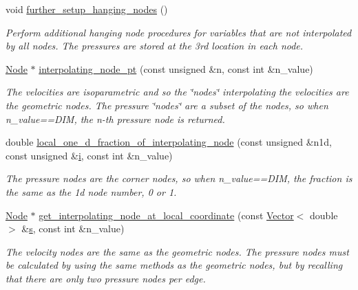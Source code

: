\begin{DoxyCompactItemize}
void \hyperlink{classoomph_1_1RefineableGeneralisedNewtonianAxisymmetricQTaylorHoodElement_aef635d4f6f88c070bf0eeda652639795}{further\+\_\+setup\+\_\+hanging\+\_\+nodes} ()
\begin{DoxyCompactList}\small\item\em Perform additional hanging node procedures for variables that are not interpolated by all nodes. The pressures are stored at the 3rd location in each node. \end{DoxyCompactList}\item 
\hyperlink{classoomph_1_1Node}{Node} $\ast$ \hyperlink{classoomph_1_1RefineableGeneralisedNewtonianAxisymmetricQTaylorHoodElement_a23cdbc15e3da1994d71e8b2bab5a53eb}{interpolating\+\_\+node\+\_\+pt} (const unsigned \&n, const int \&n\+\_\+value)
\begin{DoxyCompactList}\small\item\em The velocities are isoparametric and so the \char`\"{}nodes\char`\"{} interpolating the velocities are the geometric nodes. The pressure \char`\"{}nodes\char`\"{} are a subset of the nodes, so when n\+\_\+value==D\+IM, the n-\/th pressure node is returned. \end{DoxyCompactList}\item 
double \hyperlink{classoomph_1_1RefineableGeneralisedNewtonianAxisymmetricQTaylorHoodElement_ae4e303afba918ad72418cd384d4da3c9}{local\+\_\+one\+\_\+d\+\_\+fraction\+\_\+of\+\_\+interpolating\+\_\+node} (const unsigned \&n1d, const unsigned \&\hyperlink{cfortran_8h_adb50e893b86b3e55e751a42eab3cba82}{i}, const int \&n\+\_\+value)
\begin{DoxyCompactList}\small\item\em The pressure nodes are the corner nodes, so when n\+\_\+value==D\+IM, the fraction is the same as the 1d node number, 0 or 1. \end{DoxyCompactList}\item 
\hyperlink{classoomph_1_1Node}{Node} $\ast$ \hyperlink{classoomph_1_1RefineableGeneralisedNewtonianAxisymmetricQTaylorHoodElement_ab219c5f46716ac3ea6582580f4398f93}{get\+\_\+interpolating\+\_\+node\+\_\+at\+\_\+local\+\_\+coordinate} (const \hyperlink{classoomph_1_1Vector}{Vector}$<$ double $>$ \&\hyperlink{cfortran_8h_ab7123126e4885ef647dd9c6e3807a21c}{s}, const int \&n\+\_\+value)
\begin{DoxyCompactList}\small\item\em The velocity nodes are the same as the geometric nodes. The pressure nodes must be calculated by using the same methods as the geometric nodes, but by recalling that there are only two pressure nodes per edge. \end{DoxyCompactList}\item 

\end{DoxyCompactItemize}

